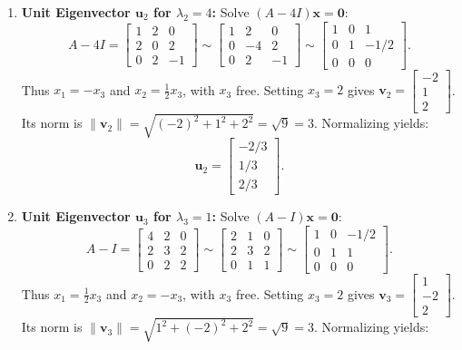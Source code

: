 \documentclass[11pt, letterpaper]{article}
\theoremstyle{definition}
\theoremstyle{remark}
\begin{document}
\begin{enumerate}[leftmargin=2em]
\[    \]
    \item \textbf{Unit Eigenvector $\mathbf{u}_2$ for $\lambda_2 = 4$:}
    Solve $(A - 4I)\mathbf{x} = \mathbf{0}$:
    \[
    A - 4I = \begin{bmatrix} 1 & 2 & 0 \\ 2 & 0 & 2 \\ 0 & 2 & -1 \end{bmatrix} \sim \begin{bmatrix} 1 & 2 & 0 \\ 0 & -4 & 2 \\ 0 & 2 & -1 \end{bmatrix} \sim \begin{bmatrix} 1 & 0 & 1 \\ 0 & 1 & -1/2 \\ 0 & 0 & 0 \end{bmatrix}.
    \]
    Thus $x_1 = -x_3$ and $x_2 = \frac{1}{2}x_3$, with $x_3$ free. Setting $x_3 = 2$ gives $\mathbf{v}_2 = \begin{bmatrix} -2 \\ 1 \\ 2 \end{bmatrix}$. Its norm is $\|\mathbf{v}_2\| = \sqrt{(-2)^2 + 1^2 + 2^2} = \sqrt{9} = 3$. Normalizing yields:
    \[
    \mathbf{u}_2 = \begin{bmatrix} -2/3 \\ 1/3 \\ 2/3 \end{bmatrix}.
    \]
    \item \textbf{Unit Eigenvector $\mathbf{u}_3$ for $\lambda_3 = 1$:}
    Solve $(A - I)\mathbf{x} = \mathbf{0}$:
    \[
    A - I = \begin{bmatrix} 4 & 2 & 0 \\ 2 & 3 & 2 \\ 0 & 2 & 2 \end{bmatrix} \sim \begin{bmatrix} 2 & 1 & 0 \\ 2 & 3 & 2 \\ 0 & 1 & 1 \end{bmatrix} \sim \begin{bmatrix} 1 & 0 & -1/2 \\ 0 & 1 & 1 \\ 0 & 0 & 0 \end{bmatrix}.
    \]
    Thus $x_1 = \frac{1}{2}x_3$ and $x_2 = -x_3$, with $x_3$ free. Setting $x_3 = 2$ gives $\mathbf{v}_3 = \begin{bmatrix} 1 \\ -2 \\ 2 \end{bmatrix}$. Its norm is $\|\mathbf{v}_3\| = \sqrt{1^2 + (-2)^2 + 2^2} = \sqrt{9} = 3$. Normalizing yields:

\end{enumerate}
\end{document}
